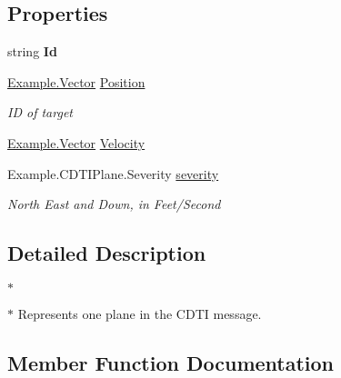 \subsection*{Properties}
\begin{DoxyCompactItemize}
\item 
\hypertarget{class_example_1_1_c_d_t_i_plane_a95d3fc498b17a8d92557081390424550}{}string {\bfseries Id}\label{class_example_1_1_c_d_t_i_plane_a95d3fc498b17a8d92557081390424550}

\item 
\hyperlink{class_example_1_1_vector}{Example.\+Vector} \hyperlink{class_example_1_1_c_d_t_i_plane_a4d6766b3ddf6726e0b6beda5f7044f39}{Position}
\begin{DoxyCompactList}\small\item\em I\+D of target\end{DoxyCompactList}\item 
\hyperlink{class_example_1_1_vector}{Example.\+Vector} \hyperlink{class_example_1_1_c_d_t_i_plane_a52e1d4c9df3e1b3b5f281bbac9e49269}{Velocity}
\item 
Example.\+C\+D\+T\+I\+Plane.\+Severity \hyperlink{class_example_1_1_c_d_t_i_plane_ac51cdc50b63036c15eb1dc03f9d8369c}{severity}
\begin{DoxyCompactList}\small\item\em North East and Down, in Feet/\+Second\end{DoxyCompactList}\end{DoxyCompactItemize}


\subsection{Detailed Description}


$\ast$

$\ast$ Represents one plane in the C\+D\+T\+I message.

\subsection{Member Function Documentation}
\hypertarget{class_example_1_1_c_d_t_i_plane_a9b57535386fd8416a21329193c1d4a8d}{}
